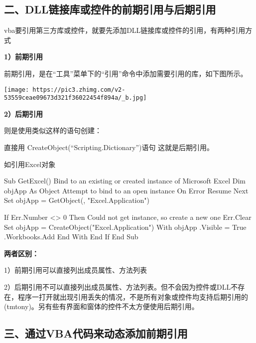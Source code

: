 \documentclass[
]{article}
\newenvironment{Shaded}{}{}
\newcommand{\NormalTok}[1]{#1}
\begin{document}
\subsection{二、DLL链接库或控件的前期引用与后期引用}\label{ux4e8cdllux94feux63a5ux5e93ux6216ux63a7ux4ef6ux7684ux524dux671fux5f15ux7528ux4e0eux540eux671fux5f15ux7528}

vba要引用第三方库或控件，就要先添加DLL链接库或控件的引用，有两种引用方式

\textbf{1）前期引用}

前期引用，是在``工具''菜单下的``引用''命令中添加需要引用的库，如下图所示。

\texttt{[image: https://pic3.zhimg.com/v2-53559ceae09673d321f36022454f894a/\_b.jpg]}

\textbf{2）后期引用}

则是使用类似这样的语句创建：

直接用 CreateObject(``Scripting.Dictionary'')语句 这就是后期引用。

如引用Excel对象

\begin{Shaded}
\begin{Highlighting}[]
\NormalTok{Sub GetExcel()}
\NormalTok{\textquotesingle{}Bind to an existing or created instance of Microsoft Excel}
\NormalTok{Dim objApp As Object}
\NormalTok{\textquotesingle{}Attempt to bind to an open instance}
\NormalTok{On Error Resume Next}
\NormalTok{Set objApp = GetObject(, "Excel.Application")}

\NormalTok{If Err.Number \textless{}\textgreater{} 0 Then}
\NormalTok{    \textquotesingle{}Could not get instance, so create a new one}
\NormalTok{    Err.Clear}
\NormalTok{    Set objApp = CreateObject("Excel.Application")}
\NormalTok{    With objApp}
\NormalTok{        .Visible = True}
\NormalTok{        .Workbooks.Add}
\NormalTok{    End With}
\NormalTok{End If}
\NormalTok{End Sub}
\end{Highlighting}
\end{Shaded}

\textbf{两者区别：}

1）前期引用可以直接列出成员属性、方法列表

2）后期引用不可以直接列出成员属性、方法列表。但不会因为控件或DLL不存在，程序一打开就出现引用丢失的情况，不是所有对象或控件均支持后期引用的(tmtony)。另有些有界面和窗体的控件不太方便使用后期引用。

\subsection{三、通过VBA代码来动态添加前期引用}\label{ux4e09ux901aux8fc7vbaux4ee3ux7801ux6765ux52a8ux6001ux6dfbux52a0ux524dux671fux5f15ux7528}
\end{document}

